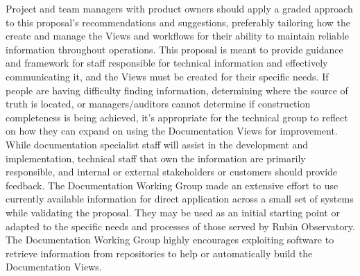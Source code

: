 Project and team managers with product owners should apply a graded approach to this proposal's recommendations and suggestions, preferably tailoring how the create and manage the Views and workflows for their ability to maintain reliable information throughout operations.
This proposal is meant to provide guidance and framework for staff responsible for technical information and effectively communicating it, and the Views must be created for their specific needs.
If people are having difficulty finding information, determining where the source of truth is located, or managers/auditors cannot determine if construction completeness is being achieved, it's appropriate for the technical group to reflect on how they can expand on using the Documentation Views for improvement.
While documentation specialist staff will assist in the development and implementation, technical staff that own the information are primarily responsible, and internal or external stakeholders or customers should provide feedback.
The Documentation Working Group made an extensive effort to use currently available information for direct application across a small set of systems while validating the proposal.
They may be used as an initial starting point or adapted to the specific needs and processes of those served by Rubin Observatory.
The Documentation Working Group highly encourages exploiting software to retrieve information from repositories to help or automatically build the Documentation Views.
